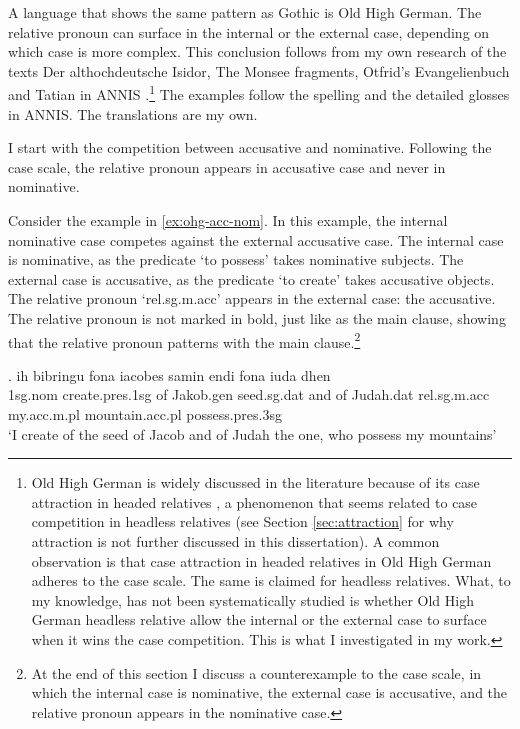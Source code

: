 A language that shows the same pattern as Gothic is Old High German. The relative pronoun can surface in the internal or the external case, depending on which case is more complex. This conclusion follows from my own research of the texts Der althochdeutsche Isidor, The Monsee fragments, Otfrid's Evangelienbuch and Tatian in ANNIS \citep{krause2016}.\footnote{
Old High German is widely discussed in the literature because of its case attraction in headed relatives \citep[cf.][]{pittner1995}, a phenomenon that seems related to case competition in headless relatives (see Section \ref{sec:attraction} for why attraction is not further discussed in this dissertation).
A common observation is that case attraction in headed relatives in Old High German adheres to the case scale. The same is claimed for headless relatives.
What, to my knowledge, has not been systematically studied is whether Old High German headless relative allow the internal or the external case to surface when it wins the case competition. This is what I investigated in my work.
}
The examples follow the spelling and the detailed glosses in ANNIS. The translations are my own.

I start with the competition between accusative and nominative. Following the case scale, the relative pronoun appears in accusative case and never in nominative.

Consider the example in \ref{ex:ohg-acc-nom}. In this example, the internal nominative case competes against the external accusative case.
The internal case is nominative, as the predicate  `to possess' takes nominative subjects.
The external case is accusative, as the predicate  `to create' takes accusative objects.
The relative pronoun  `\ac{rel}.\ac{sg}.\ac{m}.\ac{acc}' appears in the external case: the accusative. The relative pronoun is not marked in bold, just like as the main clause, showing that the relative pronoun patterns with the main clause.\footnote{
At the end of this section I discuss a counterexample to the case scale, in which the internal case is nominative, the external case is accusative, and the relative pronoun appears in the nominative case.
}

\exg. ih bibringu fona iacobes samin endi fona iuda dhen   \\
1\ac{sg}.\ac{nom} {create}.\ac{pres}.1\ac{sg}\scsub{[acc]} of Jakob.\ac{gen} seed.\ac{sg}.\ac{dat} and of Judah.\ac{dat} \ac{rel}.\ac{sg}.\ac{m}.\ac{acc} my.\ac{acc}.\ac{m}.\ac{pl} mountain.\ac{acc}.\ac{pl} possess.\ac{pres}.3\ac{sg}\scsub{[nom]}\\
`I create of the seed of Jacob and of Judah the one, who possess my mountains' \label{ex:ohg-acc-nom}

